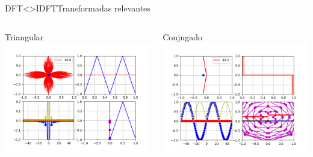 \begin{frame}{DFT<>IDFT}{Transformadas relevantes}
   \begin{columns}[c]
      \begin{column}{.5\textwidth}
         Triangular
         \centering\includegraphics[width=1.0\textwidth]{3_clase/euler_triangular}
      \end{column}
      \begin{column}{.5\textwidth}
         Conjugado
         \centering\includegraphics[width=1.0\textwidth]{3_clase/euler_conjugado}
      \end{column}
   \end{columns}
   \vfill
\end{frame}

